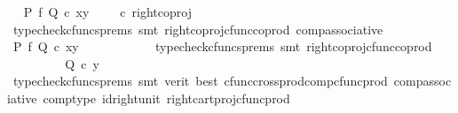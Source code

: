 \begin{isabellebody}
\ \isamarkupfalse%
\ {\isachardoublequoteopen}{\isacharparenleft}{\kern0pt}P\ {\isasymtimes}\isactrlsub f\ Q{\isacharparenright}{\kern0pt}\ {\isasymcirc}\isactrlsub c\ {\isasymlangle}x{\isacharcomma}{\kern0pt}y{\isasymrangle}\ {\isacharequal}{\kern0pt}\ {\isacharparenleft}{\kern0pt}{\isasymlangle}{\isasymf}{\isacharcomma}{\kern0pt}{\isasymf}{\isasymrangle}\ {\isasymamalg}\ {\isasymlangle}{\isasymf}{\isacharcomma}{\kern0pt}{\isasymt}{\isasymrangle}{\isacharparenright}{\kern0pt}\ {\isasymcirc}\isactrlsub c\ right{\isacharunderscore}{\kern0pt}coproj\ {\isasymone}\ {\isasymone}{\isachardoublequoteclose}\isanewline
\ \ \ \ \ \ \ \ \isamarkupfalse%
\ {\isacharparenleft}{\kern0pt}typecheck{\isacharunderscore}{\kern0pt}cfuncs{\isacharunderscore}{\kern0pt}prems{\isacharcomma}{\kern0pt}\ smt\ right{\isacharunderscore}{\kern0pt}coproj{\isacharunderscore}{\kern0pt}cfunc{\isacharunderscore}{\kern0pt}coprod\ comp{\isacharunderscore}{\kern0pt}associative{}{\isacharparenright}{\kern0pt}\isanewline
\ \ \ \ \ \ \isamarkupfalse%
\ \isamarkupfalse%
\ {\isachardoublequoteopen}{\isacharparenleft}{\kern0pt}P\ {\isasymtimes}\isactrlsub f\ Q{\isacharparenright}{\kern0pt}\ {\isasymcirc}\isactrlsub c\ {\isasymlangle}x{\isacharcomma}{\kern0pt}y{\isasymrangle}\ {\isacharequal}{\kern0pt}\ {\isasymlangle}{\isasymf}{\isacharcomma}{\kern0pt}{\isasymt}{\isasymrangle}{\isachardoublequoteclose}\isanewline
\ \ \ \ \ \ \ \ \isamarkupfalse%
\ {\isacharparenleft}{\kern0pt}typecheck{\isacharunderscore}{\kern0pt}cfuncs{\isacharunderscore}{\kern0pt}prems{\isacharcomma}{\kern0pt}\ smt\ right{\isacharunderscore}{\kern0pt}coproj{\isacharunderscore}{\kern0pt}cfunc{\isacharunderscore}{\kern0pt}coprod{\isacharparenright}{\kern0pt}\isanewline
\ \ \ \ \ \ \isamarkupfalse%
\ \isamarkupfalse%
\ {\isachardoublequoteopen}Q\ {\isasymcirc}\isactrlsub c\ y\ {\isacharequal}{\kern0pt}\ {\isasymt}{\isachardoublequoteclose}\isanewline
\ \ \ \ \ \ \ \ \isamarkupfalse%
\ {\isacharparenleft}{\kern0pt}typecheck{\isacharunderscore}{\kern0pt}cfuncs{\isacharunderscore}{\kern0pt}prems{\isacharcomma}{\kern0pt}\ smt\ {\isacharparenleft}{\kern0pt}verit{\isacharcomma}{\kern0pt}\ best{\isacharparenright}{\kern0pt}\ cfunc{\isacharunderscore}{\kern0pt}cross{\isacharunderscore}{\kern0pt}prod{\isacharunderscore}{\kern0pt}comp{\isacharunderscore}{\kern0pt}cfunc{\isacharunderscore}{\kern0pt}prod\ comp{\isacharunderscore}{\kern0pt}associative{}\ comp{\isacharunderscore}{\kern0pt}type\ id{\isacharunderscore}{\kern0pt}right{\isacharunderscore}{\kern0pt}unit{}\ right{\isacharunderscore}{\kern0pt}cart{\isacharunderscore}{\kern0pt}proj{\isacharunderscore}{\kern0pt}cfunc{\isacharunderscore}{\kern0pt}prod{\isacharparenright}{\kern0pt}\isanewline

\end{isabellebody}
